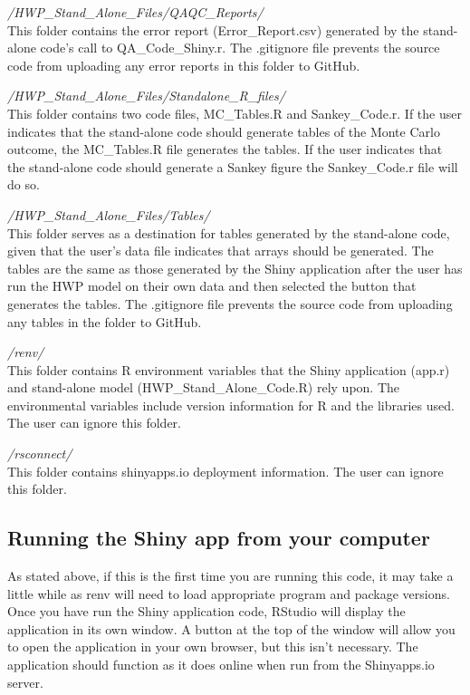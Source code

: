 \documentclass[
]{book}
\begin{document}
\emph{/HWP\_Stand\_Alone\_Files/QAQC\_Reports/}\\
This folder contains the error report (Error\_Report.csv) generated by the stand-alone code's call to QA\_Code\_Shiny.r. The .gitignore file prevents the source code from uploading any error reports in this folder to GitHub.

\emph{/HWP\_Stand\_Alone\_Files/Standalone\_R\_files/}\\
This folder contains two code files, MC\_Tables.R and Sankey\_Code.r. If the user indicates that the stand-alone code should generate tables of the Monte Carlo outcome, the MC\_Tables.R file generates the tables. If the user indicates that the stand-alone code should generate a Sankey figure the Sankey\_Code.r file will do so.

\emph{/HWP\_Stand\_Alone\_Files/Tables/}\\
This folder serves as a destination for tables generated by the stand-alone code, given that the user's data file indicates that arrays should be generated. The tables are the same as those generated by the Shiny application after the user has run the HWP model on their own data and then selected the button that generates the tables. The .gitignore file prevents the source code from uploading any tables in the folder to GitHub.

\emph{/renv/}\\
This folder contains R environment variables that the Shiny application (app.r) and stand-alone model (HWP\_Stand\_Alone\_Code.R) rely upon. The environmental variables include version information for R and the libraries used. The user can ignore this folder.

\emph{/rsconnect/}\\
This folder contains shinyapps.io deployment information. The user can ignore this folder.

\hypertarget{run-opp-shiny}{%
\subsection{Running the Shiny app from your computer}\label{run-opp-shiny}}

As stated above, if this is the first time you are running this code, it may take a little while as renv will need to load appropriate program and package versions. Once you have run the Shiny application code, RStudio will display the application in its own window. A button at the top of the window will allow you to open the application in your own browser, but this isn't necessary. The application should function as it does online when run from the Shinyapps.io server.
\end{document}
